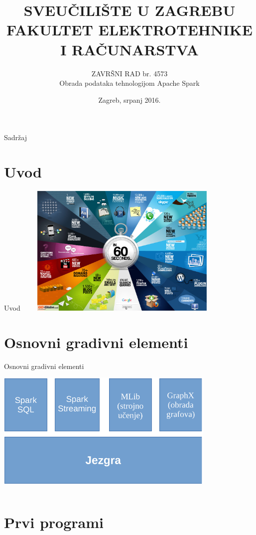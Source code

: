 \documentclass{beamer}
\title{SVEUČILIŠTE U ZAGREBU \\ FAKULTET ELEKTROTEHNIKE I RAČUNARSTVA}
\author{ZAVRŠNI RAD br. 4573 \\ Obrada podataka tehnologijom Apache Spark}
\institute[Fakultet elektrotehnike i računarstva]{Martin Matak}%
\date{Zagreb, srpanj 2016.}
\begin{document}
\begin{frame}
  \titlepage
\end{frame}

\begin{frame}{Sadržaj}
  \tableofcontents
\end{frame}

\section{Uvod}
\begin{frame}{Uvod}
	\includegraphics[width=300pt, height=180pt]{60seconds.jpg}%
\end{frame}

\section{Osnovni gradivni elementi}

\begin{frame}{Osnovni gradivni elementi}
	\includegraphics[width=300pt, height=180pt]{gradivniElementiCropped.pdf}%
\end{frame}

\section{Prvi programi}
\end{document}
